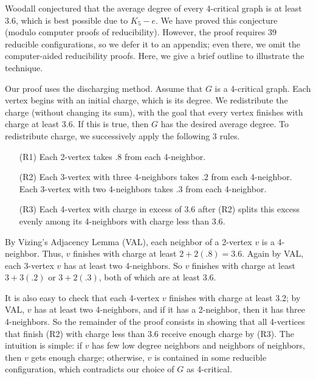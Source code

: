 \documentclass[12pt]{article}
\theoremstyle{plain}
\theoremstyle{definition}
\theoremstyle{remark}
\def\ch{\textrm{ch}}
\begin{document}

Woodall conjectured \cite{woodall2008average} that the average degree of every
4-critical graph is at least 3.6, which is best possible due to $K_5-e$.
We have proved this conjecture (modulo computer proofs of reducibility).
However, the proof requires 39 reducible configurations, so we defer it to an
appendix; even there, we omit the computer-aided reducibility proofs.
Here, we give a brief outline to illustrate the technique.

Our proof uses the discharging method.  Assume that $G$ is a 4-critical graph.
Each vertex begins with an initial charge, which is its degree.  We redistribute
the charge (without changing its sum), with the goal that every vertex finishes
with charge at least 3.6.  If this is true, then $G$ has the desired average
degree.  To redistribute charge, we successively apply the following 3 rules.

\begin{enumerate}
\item[(R1)] Each 2-vertex takes $.8$ from each 4-neighbor.
\item[(R2)] Each 3-vertex with three 4-neighbors takes $.2$ from each 4-neighbor.
Each 3-vertex with two 4-neighbors takes $.3$ from each 4-neighbor.
\item[(R3)] Each 4-vertex with charge in excess of $3.6$ after (R2) splits this
		excess evenly among its 4-neighbors with charge less than $3.6$.
\end{enumerate}
	
	
By Vizing's Adjacency Lemma (VAL), each neighbor of a 2-vertex $v$ is a
4-neighbor.  Thus, $v$ finishes with charge at least $2+2(.8)=3.6$.
Again by VAL, each 3-vertex $v$ has at least two 4-neighbors. So $v$ finishes
with charge at least $3+3(.2)$ or $3+2(.3)$, both of which are at least 3.6.

It is also easy to check that each 4-vertex $v$ finishes with charge at least 3.2;
by VAL, $v$ has at least two 4-neighbors, and if it has a 2-neighbor, then it has
three 4-neighbors.  So the remainder of the proof consists in showing that all
4-vertices that finish (R2) with charge less than 3.6 receive enough charge by
(R3).  The intuition is simple: if $v$ has few low degree neighbors and
neighbors of neighbors, then $v$ gets enough charge; otherwise, $v$ is contained
in some reducible configuration, which contradicts our choice of $G$ as
4-critical.
	
\end{document}
